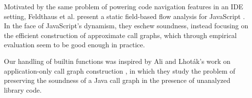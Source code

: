 Motivated by the same problem of powering code navigation features in an IDE
setting, Feldthaus et al. present a static field-based flow analysis for
JavaScript \cite{ApproximateCallGraphsIDEServices}. In the face of JavaScript's
dynamism, they eschew soundness, instead focusing on the efficient construction
of approximate call graphs, which through empirical evaluation seem to be good
enough in practice.

Our handling of builtin functions was inspired by Ali and Lhot\'{a}k's work on
application-only call graph construction
\cite{ApplicationOnlyCallGraphConstruction}, in which they study the problem of
preserving the soundness of a Java call graph in the presence of unanalyzed
library code.

